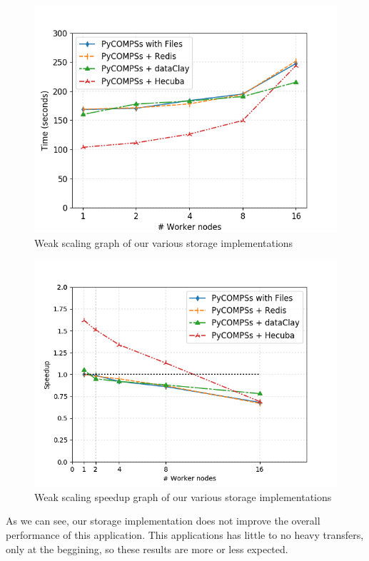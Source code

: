 \begin{figure}[ht!]
\centering
\includegraphics[scale = 0.5]{figures/storage/kmeans_weak.png}
\caption{Weak scaling graph of our various storage implementations}
\label{fig:kmeans_weak_redis}
\end{figure}

\begin{figure}[ht!]
\centering
\includegraphics[scale = 0.5]{figures/storage/kmeans_weak_speedup.png}
\caption{Weak scaling speedup graph of our various storage implementations}
\label{fig:kmeans_weak_speedup_redis}
\end{figure}

As we can see, our storage implementation does not improve the overall performance of this application. This applications has little to no heavy transfers, only at the beggining, so these results are more or less expected.

